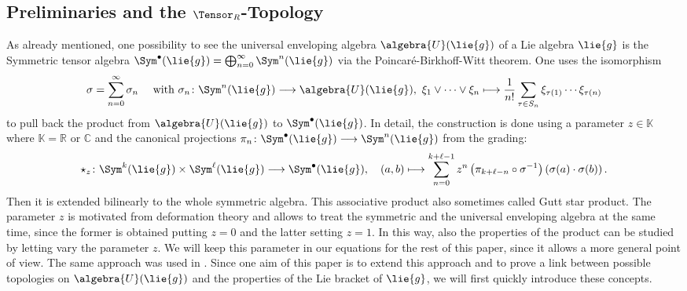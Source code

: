 \documentclass[
11pt,                          %
english                        %
]{article}
\begin{document}
\subsection{Preliminaries and the $\Tensor_R$-Topology}
As already mentioned, one possibility to see the universal enveloping algebra 
$\algebra{U}(\lie{g})$ of a Lie algebra $\lie{g}$ is the Symmetric tensor algebra 
$\Sym^{\bullet}(\lie{g}) = \bigoplus_{n=0}^\infty \Sym^n(\lie{g})$ via the 
Poincar\'e-Birkhoff-Witt theorem. One uses the isomorphism
\begin{equation}
	\label{eq:pbw-isomorphism}
	\sigma
	=
	\sum\limits_{n=0}^\infty
	\sigma_n
	\quad \text{ with }
	\sigma_n
	\colon
	\Sym^n(\lie{g})
	\longrightarrow
	\algebra{U}(\lie{g})
	, \
	\xi_1 \vee \cdots \vee \xi_n
	\longmapsto
	\frac{1}{n!}
	\sum\limits_{\tau \in S_n}
	\xi_{\tau(1)} \cdots \xi_{\tau(n)}
\end{equation}
to pull back the product from $\algebra{U}(\lie{g})$ to $\Sym^{\bullet}(\lie{g})$. In 
detail, the construction is done using a parameter $z \in \mathbb{K}$ where 
$\mathbb{K} = \mathbb{R}$ or $\mathbb{C}$ and the canonical projections $\pi_n \colon 
\Sym^{\bullet}(\lie{g}) \longrightarrow \Sym^n(\lie{g})$ from the grading:
\begin{equation}
	\label{eq:starproduct}
	\star_z
	\colon
	\Sym^k(\lie{g})
	\times
	\Sym^\ell(\lie{g})
	\longrightarrow
	\Sym^{\bullet}(\lie{g})
	, \quad
	(a, b)
	\longmapsto
	\sum\limits_{n=0}^{k + \ell - 1}
	z^n
	\left( \pi_{k + \ell - n} \circ \sigma^{-1} \right)
	\left(
		\sigma(a)
		\cdot
		\sigma(b)
	\right).
\end{equation}
Then it is extended bilinearly to the whole symmetric algebra. This associative 
product also sometimes called Gutt star product.
The parameter $z$ is motivated from deformation theory and allows to treat the 
symmetric and the universal enveloping algebra at the same time, since the former is 
obtained putting $z = 0$ and the latter setting $z = 1$. In this way, also the 
properties of the product can be studied by letting vary the parameter $z$. We will 
keep this parameter in our equations for the rest of this paper, since it allows a 
more general point of view. The same approach was used in 
\cite{esposito.stapor.waldmann:2015a:pre}. Since one aim of this paper is to extend 
this approach and to prove a link between possible topologies on $\algebra{U}
(\lie{g})$ and the properties of the Lie bracket of $\lie{g}$, we will first quickly 
introduce these concepts.
\end{document}

